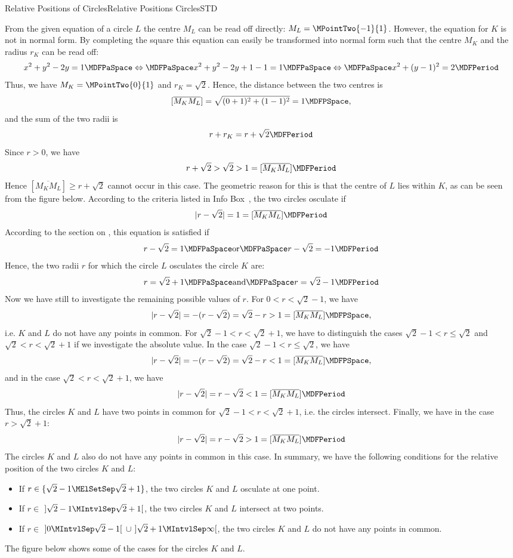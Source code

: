 \begin{MXContent}{Relative Positions of Circles}{Relative Positions Circles}{STD}
\begin{MExample}
From the given equation of a circle $L$ the centre $M_L$ can be read off directly: $M_L=\MPointTwo{-1}{1}$. However,
the equation for $K$ is not in normal form. By completing the square this equation can easily be transformed
into normal form such that the centre $M_K$ and the radius $r_K$ can be read off:
\[
 x^2+y^2-2y=1\MDFPaSpace\Leftrightarrow\MDFPaSpace x^2+y^2-2y+1-1=1\MDFPaSpace\Leftrightarrow\MDFPaSpace x^2+(y-1)^2=2\MDFPeriod
\]
Thus, we have $M_K=\MPointTwo{0}{1}$ and $r_K=\sqrt{2}$. Hence, the distance between the two centres is
\[
 [\overline{M_K M_L}]=\sqrt{(0+1)^2+(1-1)^2}=1 \MDFPSpace ,
\]
and the sum of the two radii is
\[
 r+r_K=r+\sqrt{2} \MDFPeriod
\]
Since $r>0$, we have 
\[
 r+\sqrt{2}>\sqrt{2}>1=[\overline{M_K M_L}] \MDFPeriod
\]
Hence $[\overline{M_K M_L}]\geq r+\sqrt{2}$ cannot occur in this case. The geometric reason for this is that
the centre of $L$ lies within $K$, as can be seen from the figure below. According 
to the criteria listed in Info Box~, the two circles osculate if 
\[
 |r-\sqrt{2}|=1=[\overline{M_K M_L}]\MDFPeriod 
\]
According to the section on , this equation is satisfied if
\[
 r-\sqrt{2}=1\MDFPaSpace\textrm{or}\MDFPaSpace r-\sqrt{2}=-1\MDFPeriod
\]
Hence, the two radii $r$ for which the circle $L$ osculates the circle $K$ are:
\[
 r=\sqrt{2}+1\MDFPaSpace\textrm{and}\MDFPaSpace r=\sqrt{2}-1\MDFPeriod
\]
Now we have still to investigate the remaining possible values of $r$. For $0<r<\sqrt{2}-1$, we have
\[
 |r-\sqrt{2}|=-(r-\sqrt{2})=\sqrt{2}-r>1=[\overline{M_K M_L}] \MDFPSpace ,
\]
i.e. $K$ and $L$ do not have any points in common. For $\sqrt{2}-1<r<\sqrt{2}+1$, we have to distinguish 
the cases $\sqrt{2}-1<r\leq\sqrt{2}$ and $\sqrt{2}<r<\sqrt{2}+1$ if we investigate the absolute value. In the case
$\sqrt{2}-1<r\leq\sqrt{2}$, we have
\[
 |r-\sqrt{2}|=-(r-\sqrt{2})=\sqrt{2}-r<1=[\overline{M_K M_L}] \MDFPSpace ,
\]
and in the case $\sqrt{2}<r<\sqrt{2}+1$, we have
\[
 |r-\sqrt{2}|=r-\sqrt{2}<1=[\overline{M_K M_L}] \MDFPeriod
\]
Thus, the circles $K$ and $L$ have two points in common for $\sqrt{2}-1<r<\sqrt{2}+1$, i.e. the circles intersect. 
Finally, we have in the case $r>\sqrt{2}+1$:
\[
 |r-\sqrt{2}|=r-\sqrt{2}>1=[\overline{M_K M_L}]\MDFPeriod
\]
The circles $K$ and $L$ also do not have any points in common in this case. In summary, we have the following 
conditions for the relative position of the two circles $K$ and $L$:
\begin{itemize}
 \item If $r\in\{\sqrt{2}-1\MElSetSep\sqrt{2}+1\}$, the two circles $K$ and $L$ osculate at one point.
 \item If $r\in$ $]\sqrt{2}-1\MIntvlSep\sqrt{2}+1[$, the two circles $K$ and $L$ intersect at two points.
 \item If $r\in$ $]0\MIntvlSep\sqrt{2}-1[$ $\cup$ $]\sqrt{2}+1\MIntvlSep\infty[$, the two circles $K$ and $L$ do
  not have any points in common.
\end{itemize}
The figure below shows some of the cases for the circles $K$ and $L$.
\begin{center}
 

\end{center}
\end{MExample}
\end{MXContent}
